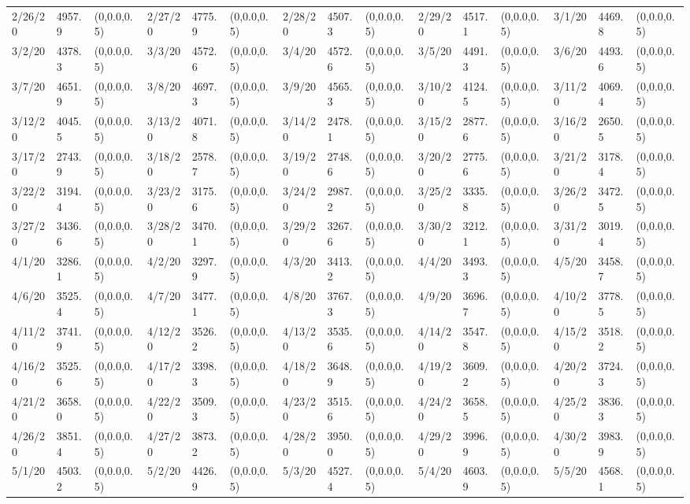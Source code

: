 \documentclass[12pt]{article}
\begin{document}
\begin{table}
\begin{center}
\begin{tabular}{p{15pt}p{15pt}p{25pt}p{15pt}p{15pt}p{25pt}p{15pt}p{15pt}p{25pt}p{15pt}p{15pt}p{25pt}p{15pt}p{15pt}p{25pt}}
            2/26/20&4957.9&(0,0.0,0.5)&2/27/20&4775.9&(0,0.0,0.5)&2/28/20&4507.3&(0,0.0,0.5)&2/29/20&4517.1&(0,0.0,0.5)&3/1/20&4469.8&(0,0.0,0.5)\\
            3/2/20&4378.3&(0,0.0,0.5)&3/3/20&4572.6&(0,0.0,0.5)&3/4/20&4572.6&(0,0.0,0.5)&3/5/20&4491.3&(0,0.0,0.5)&3/6/20&4493.6&(0,0.0,0.5)\\
            3/7/20&4651.9&(0,0.0,0.5)&3/8/20&4697.3&(0,0.0,0.5)&3/9/20&4565.3&(0,0.0,0.5)&3/10/20&4124.5&(0,0.0,0.5)&3/11/20&4069.4&(0,0.0,0.5)\\
            3/12/20&4045.5&(0,0.0,0.5)&3/13/20&4071.8&(0,0.0,0.5)&3/14/20&2478.1&(0,0.0,0.5)&3/15/20&2877.6&(0,0.0,0.5)&3/16/20&2650.5&(0,0.0,0.5)\\
            3/17/20&2743.9&(0,0.0,0.5)&3/18/20&2578.7&(0,0.0,0.5)&3/19/20&2748.6&(0,0.0,0.5)&3/20/20&2775.6&(0,0.0,0.5)&3/21/20&3178.4&(0,0.0,0.5)\\
            3/22/20&3194.4&(0,0.0,0.5)&3/23/20&3175.6&(0,0.0,0.5)&3/24/20&2987.2&(0,0.0,0.5)&3/25/20&3335.8&(0,0.0,0.5)&3/26/20&3472.5&(0,0.0,0.5)\\
            3/27/20&3436.6&(0,0.0,0.5)&3/28/20&3470.1&(0,0.0,0.5)&3/29/20&3267.6&(0,0.0,0.5)&3/30/20&3212.1&(0,0.0,0.5)&3/31/20&3019.4&(0,0.0,0.5)\\
            4/1/20&3286.1&(0,0.0,0.5)&4/2/20&3297.9&(0,0.0,0.5)&4/3/20&3413.2&(0,0.0,0.5)&4/4/20&3493.3&(0,0.0,0.5)&4/5/20&3458.7&(0,0.0,0.5)\\
            4/6/20&3525.4&(0,0.0,0.5)&4/7/20&3477.1&(0,0.0,0.5)&4/8/20&3767.3&(0,0.0,0.5)&4/9/20&3696.7&(0,0.0,0.5)&4/10/20&3778.5&(0,0.0,0.5)\\
            4/11/20&3741.9&(0,0.0,0.5)&4/12/20&3526.2&(0,0.0,0.5)&4/13/20&3535.6&(0,0.0,0.5)&4/14/20&3547.8&(0,0.0,0.5)&4/15/20&3518.2&(0,0.0,0.5)\\
            4/16/20&3525.6&(0,0.0,0.5)&4/17/20&3398.3&(0,0.0,0.5)&4/18/20&3648.9&(0,0.0,0.5)&4/19/20&3609.2&(0,0.0,0.5)&4/20/20&3724.3&(0,0.0,0.5)\\
            4/21/20&3658.0&(0,0.0,0.5)&4/22/20&3509.3&(0,0.0,0.5)&4/23/20&3515.6&(0,0.0,0.5)&4/24/20&3658.5&(0,0.0,0.5)&4/25/20&3836.3&(0,0.0,0.5)\\
            4/26/20&3851.4&(0,0.0,0.5)&4/27/20&3873.2&(0,0.0,0.5)&4/28/20&3950.0&(0,0.0,0.5)&4/29/20&3996.9&(0,0.0,0.5)&4/30/20&3983.9&(0,0.0,0.5)\\
            5/1/20&4503.2&(0,0.0,0.5)&5/2/20&4426.9&(0,0.0,0.5)&5/3/20&4527.4&(0,0.0,0.5)&5/4/20&4603.9&(0,0.0,0.5)&5/5/20&4568.1&(0,0.0,0.5)\\

\end{tabular}
\end{center}
\end{table}
\end{document}

